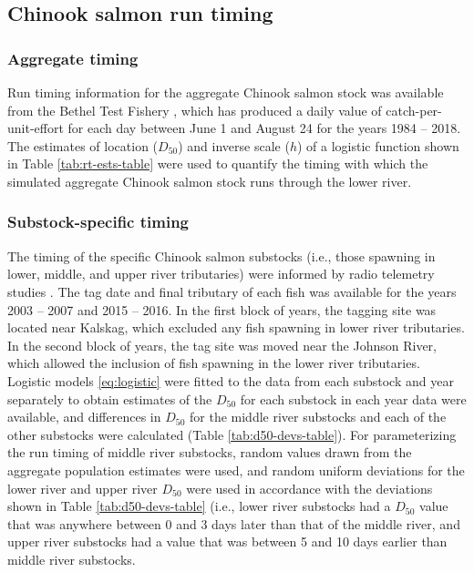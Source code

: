 \documentclass[12pt,]{book}
\theoremstyle{definition}
\theoremstyle{definition}
\theoremstyle{definition}
\theoremstyle{remark}
\begin{document}
\subsection{Chinook salmon run timing}\label{chinook-salmon-run-timing}

\subsubsection{Aggregate timing}\label{aggregate-timing}

\noindent
Run timing information for the aggregate Chinook salmon stock was
available from the Bethel Test Fishery \citep{bue-lipka-2016}, which has
produced a daily value of catch-per-unit-effort for each day between
June 1 and August 24 for the years 1984 -- 2018. The estimates of
location (\(D_{50}\)) and inverse scale (\(h\)) of a logistic function
shown in Table \ref{tab:rt-ests-table} were used to quantify the timing
with which the simulated aggregate Chinook salmon stock runs through the
lower river.

\subsubsection{Substock-specific timing}\label{substock-specific-timing}

\noindent
The timing of the specific Chinook salmon substocks (i.e., those
spawning in lower, middle, and upper river tributaries) were informed by
radio telemetry studies \citep{stuby-2007, smith-liller-2017}. The tag
date and final tributary of each fish was available for the years 2003
-- 2007 and 2015 -- 2016. In the first block of years, the tagging site
was located near Kalskag, which excluded any fish spawning in lower
river tributaries. In the second block of years, the tag site was moved
near the Johnson River, which allowed the inclusion of fish spawning in
the lower river tributaries. Logistic models \eqref{eq:logistic} were
fitted to the data from each substock and year separately to obtain
estimates of the \(D_{50}\) for each substock in each year data were
available, and differences in \(D_{50}\) for the middle river substocks
and each of the other substocks were calculated (Table
\ref{tab:d50-devs-table}). For parameterizing the run timing of middle
river substocks, random values drawn from the aggregate population
estimates were used, and random uniform deviations for the lower river
and upper river \(D_{50}\) were used in accordance with the deviations
shown in Table \ref{tab:d50-devs-table} (i.e., lower river substocks had
a \(D_{50}\) value that was anywhere between 0 and 3 days later than
that of the middle river, and upper river substocks had a value that was
between 5 and 10 days earlier than middle river substocks.
\end{document}
